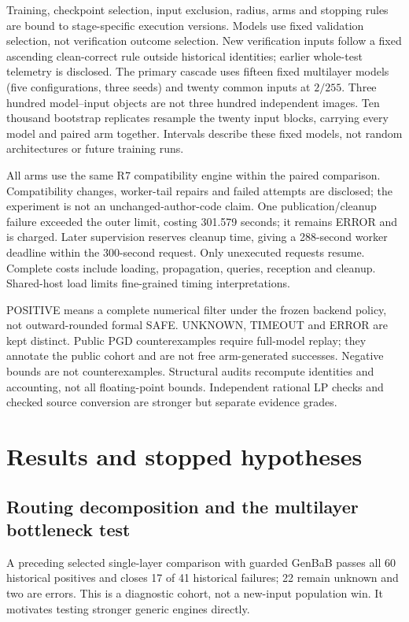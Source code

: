 \documentclass[11pt]{article}
\begin{document}
Training, checkpoint selection, input exclusion, radius, arms and stopping rules
are bound to stage-specific execution versions. Models use fixed validation
selection, not verification outcome selection. New verification inputs follow
a fixed ascending clean-correct rule outside historical identities; earlier
whole-test telemetry is disclosed. The primary cascade uses fifteen fixed
multilayer models (five configurations, three seeds) and twenty common inputs
at $2/255$. Three hundred model--input objects are not three hundred independent
images. Ten thousand bootstrap replicates resample the twenty input blocks,
carrying every model and paired arm together. Intervals describe these fixed
models, not random architectures or future training runs.

All arms use the same R7 compatibility engine within the paired comparison.
Compatibility changes, worker-tail repairs and failed attempts are disclosed;
the experiment is not an unchanged-author-code claim. One publication/cleanup
failure exceeded the outer limit, costing 301.579 seconds; it remains ERROR
and is charged. Later supervision reserves cleanup time, giving a 288-second
worker deadline within the 300-second request. Only unexecuted requests resume.
Complete costs include loading, propagation, queries, reception and cleanup.
Shared-host load limits fine-grained timing interpretations.

POSITIVE means a complete numerical filter under the frozen backend policy,
not outward-rounded formal SAFE. UNKNOWN, TIMEOUT and ERROR are kept distinct.
Public PGD counterexamples require full-model replay; they annotate the public
cohort and are not free arm-generated successes. Negative bounds are not
counterexamples. Structural audits recompute identities and accounting, not
all floating-point bounds. Independent rational LP checks and checked source
conversion are stronger but separate evidence grades.



\section{Results and stopped hypotheses}
\subsection{Routing decomposition and the multilayer bottleneck test}
A preceding selected single-layer comparison with guarded GenBaB passes all
60 historical positives and closes 17 of 41 historical failures; 22 remain
unknown and two are errors. This is a diagnostic cohort, not a new-input
population win. It motivates testing stronger generic engines directly.
\end{document}
